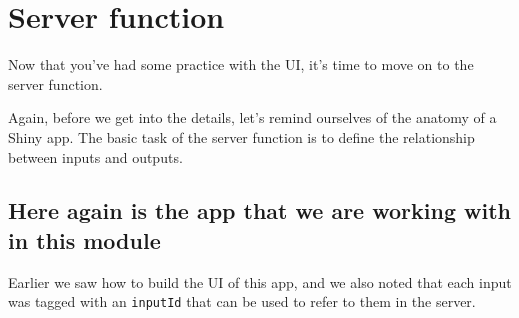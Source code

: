 \documentclass[
  letterpaper,
  DIV=11,
  numbers=noendperiod]{scrreprt}
\newenvironment{Shaded}{\begin{snugshade}}{\end{snugshade}}
\newcommand{\AttributeTok}[1]{\textcolor[rgb]{0.40,0.46,0.14}{#1}}
\newcommand{\CommentTok}[1]{\textcolor[rgb]{0.37,0.37,0.37}{#1}}
\newcommand{\FunctionTok}[1]{\textcolor[rgb]{0.28,0.35,0.67}{#1}}
\newcommand{\NormalTok}[1]{\textcolor[rgb]{0.00,0.46,0.62}{#1}}
\newcommand{\OtherTok}[1]{\textcolor[rgb]{0.00,0.46,0.62}{#1}}
\newcommand{\SpecialCharTok}[1]{\textcolor[rgb]{0.37,0.37,0.37}{#1}}
\begin{document}
\begin{Shaded}
\end{Shaded}

\hypertarget{server-function}{%
\section{Server function}\label{server-function}}

Now that you've had some practice with the UI, it's time to move on to
the server function.

Again, before we get into the details, let's remind ourselves of the
anatomy of a Shiny app. The basic task of the server function is to
define the relationship between inputs and outputs.

\hypertarget{here-again-is-the-app-that-we-are-working-with-in-this-module}{%
\subsection{Here again is the app that we are working with in this
module}\label{here-again-is-the-app-that-we-are-working-with-in-this-module}}

Earlier we saw how to build the UI of this app, and we also noted that
each input was tagged with an \texttt{inputId} that can be used to refer
to them in the server.
\end{document}
